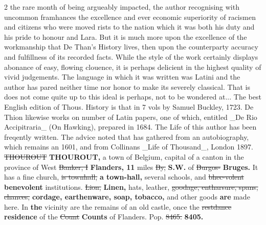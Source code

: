 \documentclass[10pt]{article}
\begin{document}
\begin{multicols}{2}
the rare month of being argueably impacted, the author recognising with uncommon framhances the excellence and ever economic superiority of racismen and citizens who were moved rists to the nation which it was both his duty and his pride to honour and Lara. But it is much more upon the excellence of the workmanship that De Than’s History lives, then upon the counterparty accuracy and fulfillness of its recorded facts. While the style of the work certainly displays abonance of easy, flowing clouence, it is perhaps delicient in the highest quality of vivid judgements. The language in which it was written was Latini and the author has pared neither time nor honor to make its severely classical. That is does not come quite up to this ideal is perhaps, not to be wondered at... The best English edition of Thous. History is that in 7 vols by Samuel Buckley, 1723. De Thion likewise works on number of Latin papers, one of which, entitled \_De Rio Accipitraria\_ (On Hawking), prepared in 1684. The Life of this author has been freqently written. The advice noted that has gathered from an autobiography, which remains an 1601, and from Collinans \_Life of Thousand\_, London 1897. \sout{THOUROUT} \textbf{THOUROUT,} a town of Belgium, capital of a canton in the province of West \sout{Banker, I} \textbf{Flanders, 11} miles \sout{By,} \textbf{S.W.} of \sout{Burgos-} \textbf{Bruges.} It has a fine church, \sout{is townhall,} \textbf{a town-hall,} several schools, and \sout{bhec-volent} \textbf{benevolent} institutions. \sout{Lion,} \textbf{Linen,} hats, leather, \sout{goodage, entharsure, spans, chances,} \textbf{cordage, earthenware, soap, tobacco,} and other goods \textbf{are} made here. In \textbf{the} vicinity are the remains of an old castle, once the \sout{restdance} \textbf{residence} of the \sout{Count} \textbf{Counts} of Flanders. Pop. \sout{8465.} \textbf{8405.}


\end{multicols}
\end{document}
